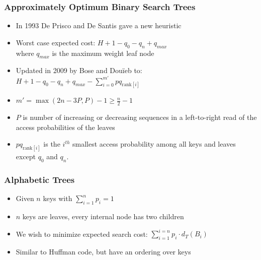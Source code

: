 \documentclass[]{beamer}
\theoremstyle{plain}
\begin{document}
\begin{frame} \frametitle{Approximately Optimum Binary Search Trees}

\begin{itemize}
\item In 1993 De Prisco and De Santis gave a new heuristic \cite{de1993binary}

\item Worst case expected cost: $H+1-q_0-q_n+q_{max}$ \\
 where $q_{max}$ is the maximum weight leaf node

\item Updated in 2009 by Bose and Dou\"{i}eb to: \\
$H + 1 - q_0 - q_n + q_{max} - \sum_{i=0}^{m'} pq_{\text{rank}[i]}$

\item $m'=\max({2n-3P,P})-1 \geq \frac{n}{2} - 1$ 

\item $P$ is number of increasing or decreasing sequences in a left-to-right read of the access probabilities of the leaves

\item $pq_{\text{rank}[i]}$ is the $i^{th}$ smallest access probability among all keys and leaves except $q_0$ and $q_n$.


\end{itemize}

\end{frame}

 
\begin{frame} \frametitle{Alphabetic Trees}
\begin{scriptsize}
\begin{center}
\end{center}
\end{scriptsize}

\begin{itemize}
\item Given $n$ keys with $\sum_{i=1}^{n} p_i = 1$

\item $n$ keys are leaves, every internal node has two children

\item We wish to minimize expected search cost: $\sum_{i=1}^{i=n} p_i \cdot d_T(B_i)$


\item Similar to Huffman code, but have an ordering over keys \cite{huffman1952method}

\end{itemize}

\end{frame}
\end{document}
